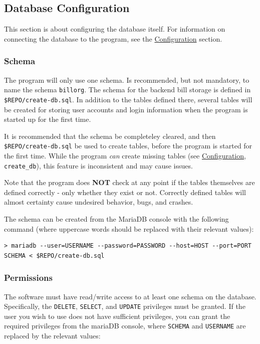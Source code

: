 \documentclass{article}
\begin{document}
\subsection{Database Configuration}

This section is about configuring the database itself. For information on connecting the database to the program, see the \hyperref[sec:admin:conf]{Configuration} section.

\subsubsection{Schema}

The program will only use one schema. Is recommended, but not mandatory, to name the schema \verb_billorg_. The schema for the backend bill storage is defined in \verb_$REPO/create-db.sql_. In addition to the tables defined there, several tables will be created for storing user accounts and login information when the program is started up for the first time.

It is recommended that the schema be completeley cleared, and then \verb_$REPO/create-db.sql_ be used to create tables, before the program is started for the first time. While the program \textit{can} create missing tables (see \hyperref[sec:admin:conf]{Configuration}, \verb-create_db-), this feature is inconsistent and may cause issues. 

Note that the program does \textbf{NOT} check at any point if the tables themselves are defined correctly - only whether they exist or not. Correctly defined tables will almost certainty cause undesired behavior, bugs, and crashes.

The schema can be created from the MariaDB console with the following command (where uppercase words should be replaced with their relevant values):

\begin{verbatim}
> mariadb --user=USERNAME --password=PASSWORD --host=HOST --port=PORT SCHEMA < $REPO/create-db.sql
\end{verbatim}

\subsubsection{Permissions}

The software must have read/write access to at least one schema on the database. 
Specifically, the \verb_DELETE_, \verb_SELECT_, and \verb_UPDATE_ privileges must be granted. If the user you wish to use does not have sufficient privileges, you can grant the required privileges from the mariaDB console, where \verb_SCHEMA_ and \verb_USERNAME_ are replaced by the relevant values:
\end{document}
